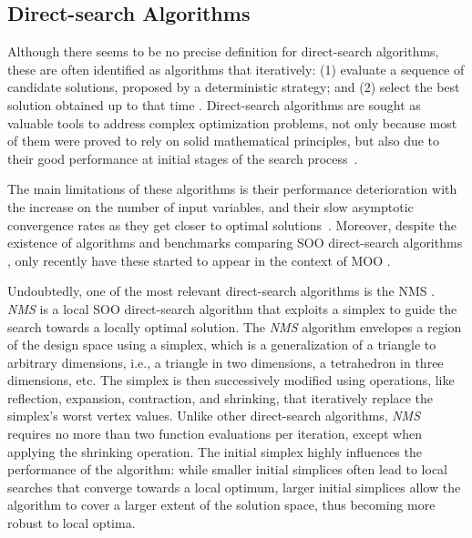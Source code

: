 	\subsection{Direct-search Algorithms}
	\label{ssec:direct-search}
	
	Although there seems to be no precise definition for direct-search algorithms, these are often identified as algorithms that iteratively: (1) evaluate a sequence of candidate solutions, proposed by a deterministic strategy; and (2) select the best solution obtained up to that time \cite{Conn2009}. Direct-search algorithms are sought as valuable tools to address complex optimization problems, not only because most of them were proved to rely on solid mathematical principles, but also due to their good performance at initial stages of the search process~\cite{Rios2013}. 
	
	The main limitations of these algorithms is their performance deterioration with the increase on the number of input variables, and their slow asymptotic convergence rates as they get closer to optimal solutions~\cite{Kolda2003}. Moreover, despite the existence of algorithms and benchmarks comparing SOO direct-search algorithms \cite{Waibel2018}, only recently have these started to appear in the context of MOO \cite{Custodio2010}. 
	
	Undoubtedly, one of the most relevant direct-search algorithms is the NMS \cite{Nelder1964}. \textit{\ac{NMS}} is a local \ac{SOO} direct-search algorithm that exploits a simplex to guide the search towards a locally optimal solution. The \textit{\ac{NMS}} algorithm envelopes a region of the design space using a simplex, which is a generalization of a triangle to arbitrary dimensions, i.e., a triangle in two dimensions, a tetrahedron in three dimensions, etc. The simplex is then successively modified using operations, like reflection, expansion, contraction, and shrinking, that iteratively replace the simplex's worst vertex values. %
	Unlike other direct-search algorithms, \textit{\ac{NMS}} requires no more than two function evaluations per iteration, except when applying the shrinking operation. The initial simplex highly influences the performance of the algorithm: while smaller initial simplices often lead to local searches that converge towards a local optimum, larger initial simplices allow the algorithm to cover a larger extent of the solution space, thus becoming more robust to local optima.
	
